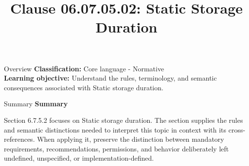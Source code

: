 \documentclass[10pt,letterpaper]{article}
\title{Clause 06.07.05.02: Static Storage Duration}
\author{}
\date{}
\begin{document}
\maketitle
\begin{CornellOverviewBox}{Overview}
\textbf{Classification:} Core language - Normative\\[2pt]
\textbf{Learning objective:} Understand the rules, terminology, and semantic consequences associated with Static storage duration.
\end{CornellOverviewBox}\begin{CornellSummaryBox}{Summary}
{\sffamily\bfseries\color{Accent} Summary}\par\vspace{3pt}Section 6.7.5.2 focuses on Static storage duration. The section supplies the rules and semantic distinctions needed to interpret this topic in context with its cross-references. When applying it, preserve the distinction between mandatory requirements, recommendations, permissions, and behavior deliberately left undefined, unspecified, or implementation-defined.
\end{CornellSummaryBox}
\end{document}
